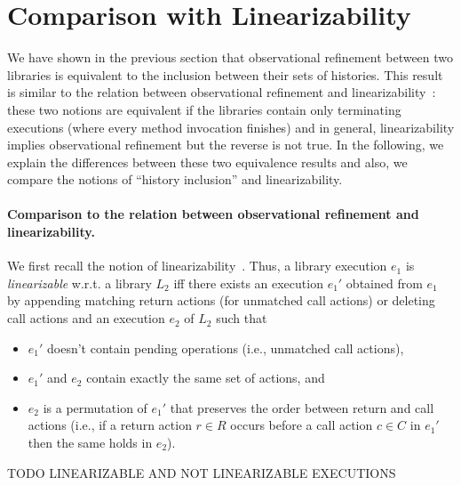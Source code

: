 \section{Comparison with Linearizability}
\label{sec:lin}


We have shown in the previous section that observational refinement between two libraries is 
equivalent to the inclusion between their sets of histories. This result is
similar to the relation between observational refinement and 
linearizability~\cite{journals/tcs/FilipovicORY10}: these two notions are equivalent if the libraries
contain only terminating executions (where every method invocation finishes) and in general,
linearizability implies observational refinement but the reverse is not true.
In the following, we explain the differences between these two equivalence results and also, we compare
the notions of ``history inclusion'' and linearizability.

\paragraph{Comparison to the relation between observational refinement and linearizability.}
We first recall the notion of
linearizability~\cite{journals/toplas/HerlihyW90}. Thus, a library execution $e_1$ is \emph{linearizable} w.r.t. a
library $L_2$ iff there exists an execution $e_1'$ obtained from $e_1$ by
appending matching return actions (for unmatched call actions) or deleting call actions
and an execution $e_2$ of $L_2$ such that 
\begin{itemize}
	\item $e_1'$ doesn't contain pending operations 
(i.e., unmatched call actions), 
	\item $e_1'$ and $e_2$ contain exactly the same set of actions, and 
	\item $e_2$ is a permutation of $e_1'$ that preserves the order between return and call
actions (i.e., if a return action $r\in R$ occurs before a call action $c\in C$
in $e_1'$ then the same holds in $e_2$). 
\end{itemize}

\begin{example}

TODO LINEARIZABLE AND NOT LINEARIZABLE EXECUTIONS

\end{example}

